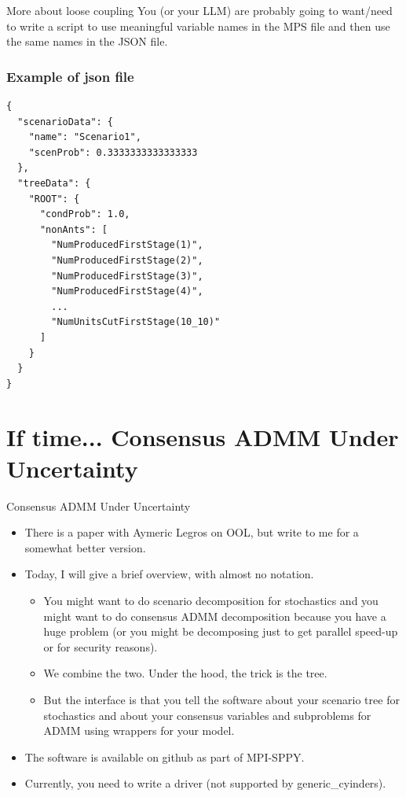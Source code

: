 \documentclass[9pt,usenames,dvipsnames]{beamer}
\begin{document}
\begin{frame}{More about loose coupling}
  You (or your LLM) are probably going to want/need to write a script to use meaningful variable names in the MPS file
  and then use the same names in the JSON file.
\end{frame}

\begin{frame}[fragile]
  \frametitle{Example of json file}
\begin{verbatim}
{
  "scenarioData": {
    "name": "Scenario1",
    "scenProb": 0.3333333333333333
  },
  "treeData": {
    "ROOT": {
      "condProb": 1.0,
      "nonAnts": [
        "NumProducedFirstStage(1)",
        "NumProducedFirstStage(2)",
        "NumProducedFirstStage(3)",
        "NumProducedFirstStage(4)",
        ...
        "NumUnitsCutFirstStage(10_10)"
      ]
    }
  }
}  
\end{verbatim}
  \end{frame}



\section{If time... Consensus ADMM Under Uncertainty}

\begin{frame}{Consensus ADMM Under Uncertainty}
  \begin{itemize}
  \item There is a paper with Aymeric Legros on OOL, but write to me for a somewhat better version.
  \item Today, I will give a brief overview, with almost no notation.
    \begin{itemize}
    \item You might want to do scenario decomposition for stochastics and you might want to do consensus ADMM decomposition because you have a huge problem (or you might be decomposing just to get parallel speed-up or for security reasons).
    \item We combine the two. Under the hood, the trick is the tree.
      \item But the interface is that you tell the software about your scenario tree for stochastics and about your consensus variables and subproblems for ADMM using wrappers for your model.
      \end{itemize}
  \item The software is available on github as part of MPI-SPPY.
    \item Currently, you need to write a driver (not supported by generic\_cyinders).
  \end{itemize}
\end{frame}
\end{document}
